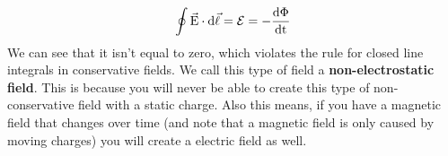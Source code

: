 \begin{equation*}
	\oint \vec{\mathrm{E}} \cdot \mathrm{d}\vec{\mathrm{\ell}} = \mathcal{E} = -\frac{\mathrm{d \Phi}}{\mathrm{d t}}
\end{equation*}
We can see that it isn't equal to zero, which violates the rule for closed line integrals in conservative fields. We call this type of field a \textbf{non-electrostatic field}. This is because you will never be able to create this type of non-conservative field with a static charge. Also this means, if you have a magnetic field that changes over time (and note that a magnetic field is only caused by moving charges) you will create a electric field as well. 
